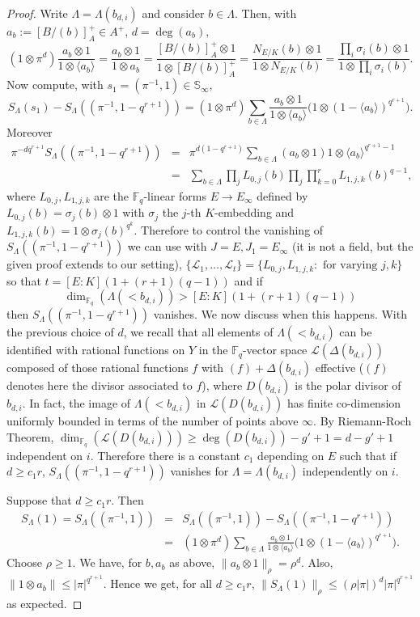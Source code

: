 \documentclass[11pt]{amsart}
\numberwithin{equation}{section}
\newcommand{\FF}{\mathbb{F}}
\begin{document}
\begin{proof}
Write $\Lambda=\Lambda(b_{d,i})$ and consider $b\in\Lambda$. Then, with $a_b:=[B/(b)]_A^+\in A^+$, $d=\deg(a_b)$,
$$(1\otimes\pi^{d})\frac{a_b\otimes1}{1\otimes\langle a_b\rangle}=\frac{a_b\otimes1}{1\otimes a_b}=\frac{[B/(b)]_A^+\otimes1}{1\otimes [B/(b)]_A^+}=\frac{N_{E/K}(b)\otimes1}{1\otimes N_{E/K}(b)}=\frac{\prod_i\sigma_i(b)\otimes1}{1\otimes\prod_i\sigma_i(b)}.$$
Now compute, with $s_1=(\pi^{-1},1)\in\mathbb{S}_\infty$,
$$S_\Lambda(s_1)-S_\Lambda((\pi^{-1},1-q^{r+1}))=(1\otimes\pi^{d})\sum_{b\in\Lambda}\frac{a_b\otimes1}{1\otimes\langle a_b\rangle}\Big(1\otimes(1-\langle a_b\rangle)^{q^{r+1}}\Big).$$
Moreover
\begin{eqnarray*}
\pi^{-dq^{r+1}}S_\Lambda((\pi^{-1},1-q^{r+1}))&=&\pi^{d(1-q^{r+1})}\sum_{b\in\Lambda}(a_b\otimes1)1\otimes\langle a_b\rangle^{q^{r+1}-1}\\
&=&\sum_{b\in\Lambda}\prod_jL_{0,j}(b)\prod_j\prod_{k=0}^rL_{1,j,k}(b)^{q-1},
\end{eqnarray*}
where $L_{0,j},L_{1,j,k}$ are the $\FF_q$-linear forms
$E\rightarrow E_\infty$ defined by $L_{0,j}(b)=\sigma_j(b)\otimes1$ with $\sigma_j$ the $j$-th $K$-embedding
and $L_{1,j,k}(b)=1\otimes\sigma_j(b)^{q^k}$. Therefore to control the vanishing of $S_\Lambda((\pi^{-1},1-q^{r+1}))$
we can use \cite[Lemma 8.8.1]{GOS} with $J=E,J_1=E_\infty$ (it is not a field, but the given proof  extends to our setting), $\{\mathcal{L}_1,\ldots,\mathcal{L}_t\}=\{L_{0,j},L_{1,j,k}:\text{ for varying }j,k\}$
so that $t=[E:K](1+(r+1)(q-1))$ and if 
$$\dim_{\FF_q}(\Lambda(<b_{d,i}))>[E:K](1+(r+1)(q-1))$$
then $S_\Lambda((\pi^{-1},1-q^{r+1}))$ vanishes. We now discuss when this happens. With the previous choice of $d$, we recall that all elements of $\Lambda(<b_{d,i})$ can be identified with rational functions on $Y$ in the $\FF_q$-vector space
$\mathcal{L}(\Delta(b_{d,i}))$ composed of those rational functions $f$ with $(f)+\Delta(b_{d,i})$ effective ($(f)$ denotes here the divisor associated to $f$),
where $D(b_{d,i})$ is the polar divisor of $b_{d,i}$. In fact, the image of $\Lambda(<b_{d,i})$ in $\mathcal{L}(D(b_{d,i}))$ has finite co-dimension uniformly bounded in terms of the number of points above $\infty$. By Riemann-Roch Theorem, $\dim_{\FF_q}(\mathcal{L}(D(b_{d,i})))\geq\deg(D(b_{d,i}))-g'+1=d-g'+1$ independent on $i$. Therefore there is a constant $c_1$ depending on $E$ such that if $d\geq c_1r$, $S_\Lambda((\pi^{-1},1-q^{r+1}))$ vanishes for $\Lambda=\Lambda(b_{d,i})$ independently on $i$. 

Suppose that $d\geq c_1r$. 
Then
\begin{eqnarray*}
S_{\Lambda}(1)=S_{\Lambda}((\pi^{-1},1))&=&S_{\Lambda}((\pi^{-1},1))-S_{\Lambda}((\pi^{-1},1-q^{r+1}))\\
&=&(1\otimes\pi^d)\sum_{b\in\Lambda}\frac{a_b\otimes1}{1\otimes\langle a_b\rangle}\Big(1\otimes(1-\langle a_b\rangle)^{q^{r+1}}\Big).
\end{eqnarray*}
Choose $\rho\geq1$. We have, for $b,a_b$ as above, $\|a_b\otimes1\|_\rho=\rho^d$. Also, $\|1\otimes a_b\|\leq|\pi|^{q^{r+1}}$.
Hence we get, for all $d\geq c_1r$,
$\|S_{\Lambda}(1)\|_\rho\leq(\rho|\pi|)^d|\pi|^{q^{r+1}}$ as expected.
\end{proof}
\end{document}
